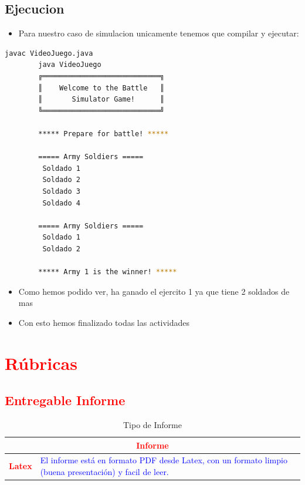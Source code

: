 \documentclass{article}
\begin{document}
        \subsection{Ejecucion}
        \begin{itemize}
            \item Para nuestro caso de simulacion unicamente tenemos que compilar y ejecutar:
        \end{itemize}
        \begin{lstlisting}[language=bash, caption={Ejecucion en la linea de comandos}]
        javac VideoJuego.java
        java VideoJuego
        ╔════════════════════════════╗
        ║    Welcome to the Battle   ║
        ║       Simulator Game!      ║
        ╚════════════════════════════╝
        
        ***** Prepare for battle! *****
        
        ===== Army Soldiers =====
         Soldado 1
         Soldado 2
         Soldado 3
         Soldado 4
        
        ===== Army Soldiers =====
         Soldado 1
         Soldado 2
        
        ***** Army 1 is the winner! *****
        \end{lstlisting}
        \begin{itemize}
            \item Como hemos podido ver, ha ganado el ejercito 1 ya que tiene 2 soldados de mas
            \item Con esto hemos finalizado todas las actividades
        \end{itemize}
	\section{\textcolor{red}{Rúbricas}}
	
	\subsection{\textcolor{red}{Entregable Informe}}
	\begin{table}[H]
		\caption{Tipo de Informe}
		\setlength{\tabcolsep}{0.5em} %
		{\renewcommand{\arraystretch}{1.5}%
		\begin{tabular}{|p{3cm}|p{12cm}|}
			\hline
			\multicolumn{2}{|c|}{\textbf{\textcolor{red}{Informe}}}  \\
			\hline 
			\textbf{\textcolor{red}{Latex}} & \textcolor{blue}{El informe está en formato PDF desde Latex,  con un formato limpio (buena presentación) y facil de leer.}   \\ 
			\hline 
			
			
		\end{tabular}
	}
	\end{table}
	
\end{document}
